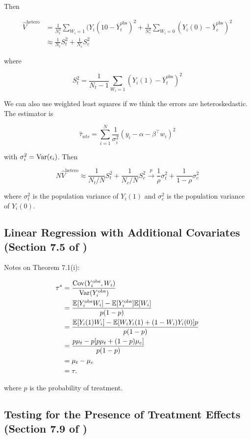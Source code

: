 Then

\begin{align*}
\hat{V}^{\text{hetero}}  & = \frac{1}{N_t^2} \sum_{W_i = 1} (Y_i(10 - \overline{Y}_t^{\text{obs}})^2 + \frac{1}{N_c^2} \sum_{W_i = 0} (Y_i(0) - \overline{Y}_c^{\text{obs}})^2
\\ & \approx \frac{1}{N_t} S_t^2 + \frac{1}{N_c}S_c^2
\end{align*}

where 

\[
S_t^2 = \frac{1}{N_t - 1} \sum_{W_i = 1} (Y_i(1) - \overline{Y}_t^{\text{obs}} )^2
\]

We can also use weighted least squares if we think the errors are heteroskedastic. The estimator is

\[
\hat{\tau}_{wls} = \sum_{i=1}^N \frac{1}{\sigma_i^2} (y_i - \alpha - \beta^\top w_i)^2
\]

with \(\sigma_i^2 = \Var(\epsilon_i)\). Then

\[
N  \hat{V}^{\text{hetero}}   \approx  \frac{1}{N_t/N} S_t^2 + \frac{1}{N_c/N}S_c^2 \xrightarrow{p} \frac{1}{\rho} \sigma_t^2 + \frac{1}{1 - \rho} \sigma_c^2
\]

where \(\sigma_t^2\) is the population variance of \(Y_i(1)\) and \(\sigma_c^2\) is the population variance of \(Y_i(0)\).


\subsection{Linear Regression with Additional Covariates (Section 7.5 of \citet{imbens_rubin_2015})}

Notes on Theorem 7.1(i):

\begin{align*}
\tau^* & = \frac{\Cov(Y_i^{\text{obs}}, W_i)}{\Var(Y_i^{\text{obs}})} 
\\ & = \frac{\E[Y_i^{\text{obs}} W_i] - \E[Y_i^{\text{obs}}] \E[ W_i]  }{p(1-p)}
\\ & = \frac{\E[Y_i (1) W_i] - \E[W_i Y_i(1) + (1 - W_i) Y_i(0)] p }{p(1-p)}
\\ & = \frac{p \mu_t - p[p \mu_t  + (1-p) \mu_c] }{p(1-p)}
\\ & = \mu_t - \mu_c
\\ & = \tau.
\end{align*}

where \(p\) is the probability of treatment.

\subsection{Testing for the Presence of Treatment Effects (Section 7.9 of \citet{imbens_rubin_2015})}


